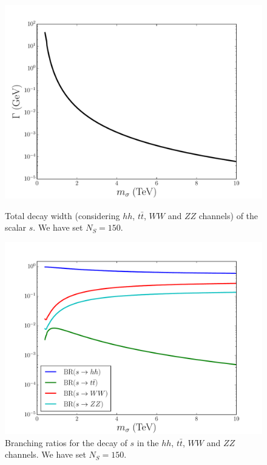 \documentclass[aps,prd,preprintnumbers,nofootinbibn,twocolumn]{revtex4}
\begin{document}
\begin{figure}[t]
\centering
\begin{minipage}[b]{0.49\textwidth}
\includegraphics[width=\columnwidth]{totalwidth}
\caption{Total decay width (considering $hh$, $t\bar{t}$, $WW$ and $ZZ$ channels) of the scalar $s$. We have set $N_S=150$.}\label{fig:totalwidth}
\end{minipage}
\hfill
\begin{minipage}[b]{0.49\textwidth}
\includegraphics[width=\columnwidth]{BR}
\caption{Branching ratios for the decay of $s$ in the $hh$, $t\bar{t}$, $WW$ and $ZZ$ channels. We have set $N_S=150$.}\label{fig:BR}
\end{minipage}
\end{figure}
\end{document}
